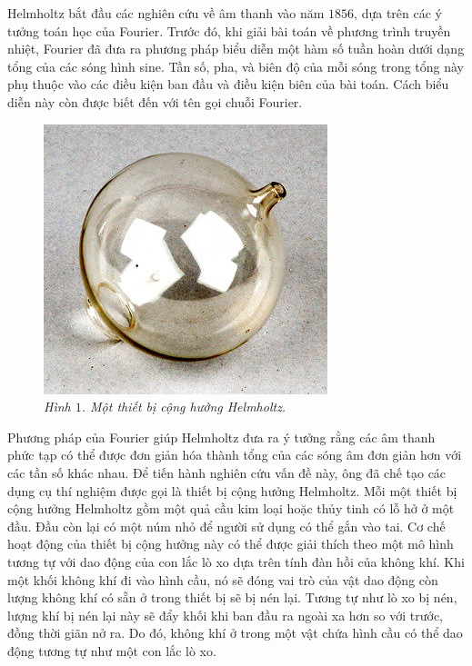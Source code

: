 \begin{multicols}{2}
	\vskip 0.1cm
	Helmholtz bắt đầu các nghiên cứu về âm thanh vào năm $1856$, dựa trên các ý tưởng toán học của Fourier. Trước đó, khi giải bài toán về phương trình truyền nhiệt, Fourier đã đưa ra phương pháp biểu diễn một hàm số tuần hoàn dưới dạng tổng của các sóng hình sine. Tần số, pha, và biên độ của mỗi sóng trong tổng này phụ thuộc vào các điều kiện ban đầu và điều kiện biên của bài toán. Cách biểu diễn này còn được biết đến với tên gọi chuỗi Fourier.
	\begin{figure}[H]
		\centering
		\vspace*{-5pt}
		\captionsetup{labelformat= empty, justification=centering}
		\includegraphics[width=1\linewidth]{2}
		\caption{\small\textit{\color{timhieukhoahoc}Hình $1$. Một thiết bị cộng hưởng Helmholtz.}}
		\vspace*{-10pt}
	\end{figure}
	Phương pháp của Fourier giúp Helmholtz đưa ra ý tưởng rằng các âm thanh phức tạp có thể được đơn giản hóa thành tổng của các sóng âm đơn giản hơn với các tần số khác nhau. Để tiến hành nghiên cứu vấn đề này, ông đã chế tạo các dụng cụ thí nghiệm được gọi là thiết bị cộng hưởng Helmholtz. Mỗi một thiết bị cộng hưởng Helmholtz gồm một quả cầu kim loại hoặc thủy tinh có lỗ hở ở một đầu. Đầu còn lại có một núm nhỏ để người sử dụng có thể gắn vào tai.
	\vskip 0.1cm
	Cơ chế hoạt động của thiết bị cộng hưởng này có thể được giải thích theo một mô hình tương tự với dao động của con lắc lò xo dựa trên tính đàn hồi của không khí. Khi một khối không khí đi vào hình cầu, nó sẽ đóng vai trò của vật dao động còn lượng không khí có sẵn ở trong thiết bị sẽ bị nén lại. Tương tự như lò xo bị nén, lượng khí bị nén lại này sẽ đẩy khối khi ban đầu ra ngoài xa hơn so với trước, đồng thời giãn nở ra. Do đó, không khí ở trong một vật chứa hình cầu có thể dao động tương tự như một con lắc lò xo.

\end{multicols}
